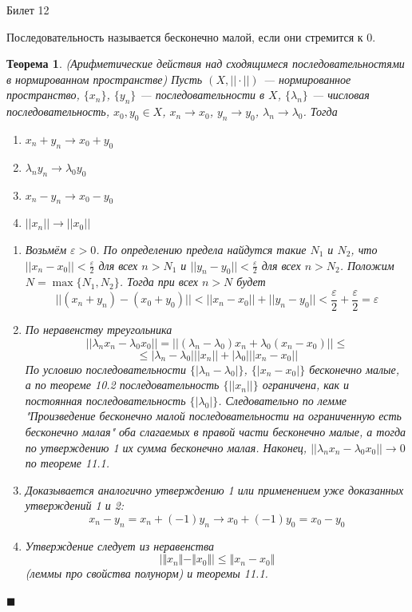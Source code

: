 \documentclass[12pt,a4paper]{article}
\newtheorem*{theorem*}{Теорема}
\begin{document}
\begin{center}
Билет 12
\end{center}

Последовательность называется бесконечно малой, если они стремится к $0$.

\begin{theorem*}(Арифметические действия над 
\newline сходящимеся последовательностями в 
\newline нормированном пространстве)
\label{12.1}
Пусть $(X, ||\cdot||)$ --- нормированное пространство, $\{ x_n \}$, $\{ y_n \}$ --- последовательности в $X$, $\{\lambda_n\}$ --- числовая последовательность, $x_0, y_0 \in X$, $x_n \rightarrow x_0$, $y_n \rightarrow y_0$, $\lambda_n \rightarrow \lambda_0$. Тогда
\begin{enumerate}
\item $x_n + y_n \rightarrow x_0 + y_0$
\item $\lambda_n y_n \rightarrow \lambda_0 y_0$
\item $x_n - y_n \rightarrow x_0 - y_0$
\item $||x_n|| \rightarrow ||x_0||$
\end{enumerate}

\begin{enumerate}
\item Возьмём $\varepsilon > 0$. По определению предела найдутся такие $N_1$ и $N_2$, что $||x_n - x_0|| < \frac{\varepsilon}{2}$ для всех $n>N_1$ и $||y_n - y_0|| < \frac{\varepsilon}{2}$ для всех $n>N_2$. Положим $N=\max\{N_1, N_2\}$. Тогда при всех $n > N$ будет
$$
|| (x_n + y_n) - (x_0 + y_0) || < || x_n - x_0 || + || y_n - y_0 || < \frac{\varepsilon}{2} + \frac{\varepsilon}{2} = \varepsilon
$$

\item По неравенству треугольника 
$$
|| \lambda_n x_n - \lambda_0 x_0 || = || (\lambda_n - \lambda_0) x_n + \lambda_0 (x_n - x_0) || \leq
$$
$$
\leq |\lambda_n - \lambda_0| || x_n || + |\lambda_0|	||x_n - x_0||
$$
По условию последовательности $\{|\lambda_n - \lambda_0|\}$, $\{|x_n - x_0|\}$ бесконечно малые, а по теореме 10.2 последовательность $\{||x_n||\}$ ограничена, как и постоянная последовательность $\{|\lambda_0|\}$. Следовательно по лемме "Произведение бесконечно малой последовательности на ограниченную есть бесконечно малая" оба слагаемых в правой части бесконечно малые, а тогда по утверждению 1 их сумма бесконечно малая. Наконец, $||\lambda_n x_n - \lambda_0 x_0||\rightarrow 0$ по теореме 11.1.

\item Доказывается аналогично утверждению 1 или применением уже доказанных утверждений 1 и 2:
$$
x_n - y_n = x_n + (-1) y_n \rightarrow x_0 + (-1) y_0 = x_0 - y_0
$$

\item Утверждение следует из неравенства
$$
\big\vert \Vert x_n \Vert - \Vert x_0 \Vert \big\vert \leq \Vert x_n - x_0 \Vert
$$
(леммы про свойства полунорм) и теоремы 11.1.
\end{enumerate}
$\blacksquare$
\end{theorem*}
\end{document}
